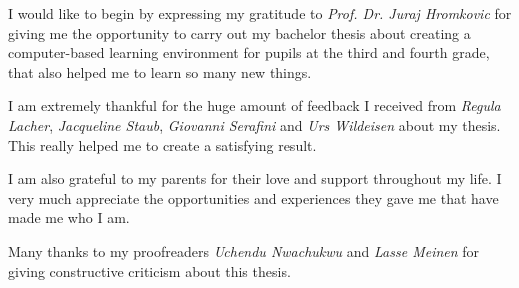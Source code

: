 I would like to begin by expressing my gratitude to \textit{Prof. Dr. Juraj Hromkovic} for giving me the opportunity to carry out my bachelor thesis about creating a computer-based learning environment for pupils at the third and fourth grade, that also helped me to learn so many new things.

I am extremely thankful for the huge amount of feedback I received from \textit{Regula Lacher}, \textit{Jacqueline Staub}, \textit{Giovanni Serafini} and \textit{Urs Wildeisen} about my thesis. This really helped me to create a satisfying result. 

I am also grateful to my parents for their love and support throughout my life. I very much appreciate the opportunities and experiences they gave me that have made me who I am.

Many thanks to my proofreaders \textit{Uchendu Nwachukwu} and \textit{Lasse Meinen} for giving constructive criticism about this thesis.